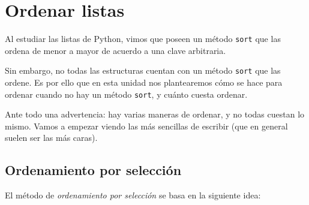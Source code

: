 \chapter{Ordenar listas}

Al estudiar las listas de Python, vimos que poseen un método \lstinline!sort!
que las ordena de menor a mayor de acuerdo a una clave arbitraria.

Sin embargo, no todas las estructuras cuentan con un método
\lstinline!sort! que las ordene.  Es por ello que en esta unidad nos
plantearemos cómo se hace para ordenar cuando no hay un método
\lstinline!sort!, y cuánto cuesta ordenar.

Ante todo una advertencia: hay varias maneras de ordenar, y no todas
cuestan lo mismo. Vamos a empezar viendo las más sencillas de escribir
(que en general suelen ser las más caras).

\section{Ordenamiento por selección}
El método de {\it ordenamiento por selección} se basa en la siguiente idea:


